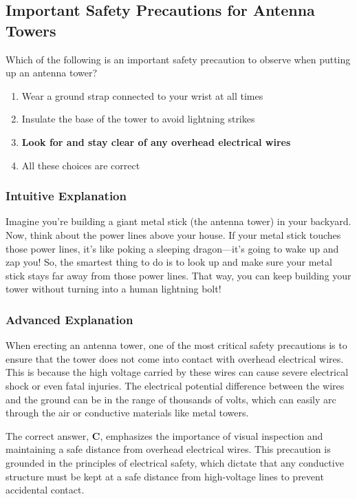 \subsection{Important Safety Precautions for Antenna Towers}
\label{T0B04}

\begin{tcolorbox}[colback=gray!10!white,colframe=black!75!black,title=T0B04]
Which of the following is an important safety precaution to observe when putting up an antenna tower?
\begin{enumerate}[label=\Alph*)]
    \item Wear a ground strap connected to your wrist at all times
    \item Insulate the base of the tower to avoid lightning strikes
    \item \textbf{Look for and stay clear of any overhead electrical wires}
    \item All these choices are correct
\end{enumerate}
\end{tcolorbox}

\subsubsection{Intuitive Explanation}
Imagine you're building a giant metal stick (the antenna tower) in your backyard. Now, think about the power lines above your house. If your metal stick touches those power lines, it’s like poking a sleeping dragon—it’s going to wake up and zap you! So, the smartest thing to do is to look up and make sure your metal stick stays far away from those power lines. That way, you can keep building your tower without turning into a human lightning bolt!

\subsubsection{Advanced Explanation}
When erecting an antenna tower, one of the most critical safety precautions is to ensure that the tower does not come into contact with overhead electrical wires. This is because the high voltage carried by these wires can cause severe electrical shock or even fatal injuries. The electrical potential difference between the wires and the ground can be in the range of thousands of volts, which can easily arc through the air or conductive materials like metal towers.

The correct answer, \textbf{C}, emphasizes the importance of visual inspection and maintaining a safe distance from overhead electrical wires. This precaution is grounded in the principles of electrical safety, which dictate that any conductive structure must be kept at a safe distance from high-voltage lines to prevent accidental contact.

